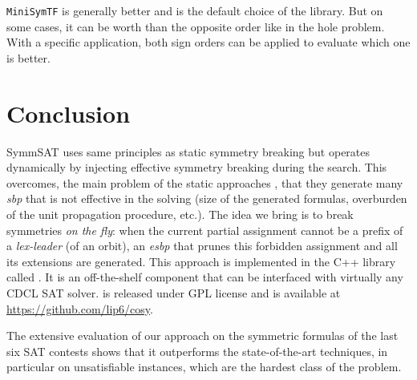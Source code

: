 \texttt{MiniSymTF} is generally better and is the default choice of the library.
But on some cases, it can be worth than the opposite order like in the hole problem.
With a specific application, both sign orders can be applied to evaluate which one is better.



\section{Conclusion}
SymmSAT uses same principles as static symmetry breaking but operates dynamically by 
injecting effective symmetry breaking during the search.
This overcomes, the main problem of the static approaches , that they
generate many \textit{sbp} that is not effective in the solving (size of the
generated formulas, overburden of the unit propagation procedure, etc.).
The idea we bring is to break symmetries \emph{on the fly}: when the current
partial assignment cannot be a prefix of a \textit{lex-leader} (of an orbit),
an \textit{esbp} that prunes this forbidden assignment and all its extensions are generated. 
This approach is implemented in the C++ library called \libdsb{}. It is an
off-the-shelf component that can be interfaced with virtually any CDCL SAT
solver. \libdsb{} is released under GPL license and is available at
\url{https://github.com/lip6/cosy}.
 
The extensive evaluation of our approach on the symmetric formulas of the last
six SAT contests shows that it outperforms the state-of-the-art techniques, in
particular on unsatisfiable instances, which are the hardest class of the
problem.